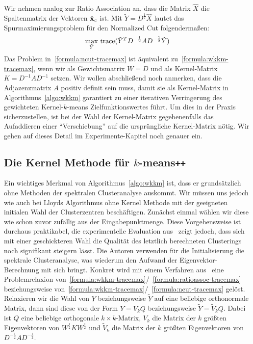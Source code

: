 Wir nehmen analog zur Ratio Association an, dass die Matrix $\hat{X}$ die Spaltenmatrix der Vektoren $\hat{\mathbf{x}}_c$ ist.
Mit $\tilde{Y} = D^\frac{1}{2} \hat{X}$ lautet das Spurmaximierungsproblem für den Normalized Cut folgendermaßen:
\begin{align}
\label{formula:ncut-tracemax}
	\max_{\tilde{Y}}{} \operatorname*{trace}( \tilde{Y}^T D^{-\frac{1}{2}} A D^{-\frac{1}{2}} \tilde{Y} )
\end{align}
Das Problem in~\ref{formula:ncut-tracemax} ist äquivalent zu~\ref{formula:wkkm-tracemax}, wenn wir als
Gewichtsmatrix $W = D$ und als Kernel-Matrix $K = D^{-1} A D^{-1}$ setzen.
\absatz
Wir wollen abschließend noch anmerken, dass die Adjazenzmatrix $A$ positiv definit sein muss, damit sie als Kernel-Matrix in
Algorithmus~\ref{algo:wkkm} garantiert zu einer iterativen Verringerung des gewichteten Kernel-$k$-means Zielfunktionswertes
führt. Um dies in der Praxis sicherzustellen, ist bei der Wahl der Kernel-Matrix gegebenenfalls das Aufaddieren einer
"`Verschiebung"' auf die ursprüngliche Kernel-Matrix nötig. Wir gehen auf dieses Detail im Experimente-Kapitel noch genauer ein.

\subsection{Die Kernel Methode für \texorpdfstring{$k$}{k}-means\texttt{++}}
\label{subsection:kernelkmpp}

Ein wichtiges Merkmal von Algorithmus~\ref{algo:wkkm} ist, dass er grundsätzlich ohne Methoden der spektralen Clusteranalyse
auskommt. Wir müssen uns jedoch wie auch bei Lloyds Algorithmus ohne Kernel Methode mit der geeigneten initialen Wahl
der Clusterzentren beschäftigen. Zunächst einmal wählen wir diese wie schon zuvor zufällig aus der Eingabepunktmenge.
Diese Vorgehensweise ist durchaus praktikabel, die experimentelle Evaluation aus~\citep{DhillonGK04,DhillonGK07} zeigt jedoch,
dass sich mit einer geschickteren Wahl die Qualität des letztlich berechneten Clusterings noch signifikant steigern lässt.
Die Autoren verwenden für die Initialisierung die spektrale Clusteranalyse, was wiederum den Aufwand der Eigenvektor-Berechnung
mit sich bringt.
\absatz
Konkret wird mit einem Verfahren aus~\cite{GolubL96} eine Problemrelaxion
von~\ref{formula:wkkm-tracemax}/~\ref{formula:ratioassoc-tracemax} beziehungsweise
von~\ref{formula:wkkm-tracemax}/~\ref{formula:ncut-tracemax} gelöst.
Relaxieren wir die Wahl von $Y$ beziehungsweise $\tilde{Y}$ auf eine beliebige
orthonormale Matrix, dann sind diese von der Form $Y = V_k Q$ beziehungsweise $\tilde{Y} = \tilde{V}_k Q$.
Dabei ist $Q$ eine beliebige orthogonale $k \times k$-Matrix, $V_k$ die Matrix der $k$ größten Eigenvektoren von
$W^{\frac{1}{2}} K W^{\frac{1}{2}}$ und $\tilde{V}_k$ die Matrix der $k$ größten Eigenvektoren von
$D^{-\frac{1}{2}} A D^{-\frac{1}{2}}$.

